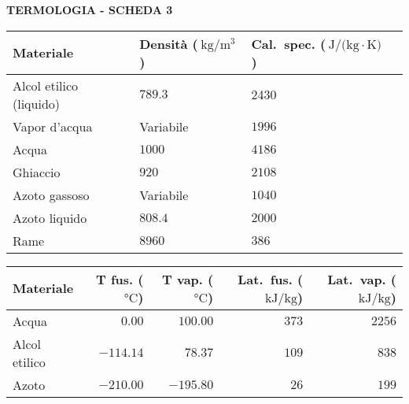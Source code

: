 

\begin{center}
    \textbf{\Large \sffamily TERMOLOGIA - SCHEDA 3}
\end{center}\vspace{\baselineskip}

\noindent
\centering\begin{tabular}{llll}
    \textbf{Materiale}  & \textbf{Densità}  ($\SI{}{\kilogram/\meter^3}$)  & \textbf{Cal.\ spec.} ($\SI{}{\joule/(\kilogram\cdot\kelvin})$) \\ \hline
    Alcol etilico (liquido) & $\num{789.3}$ & \num{2430}\\ \hline
    Vapor d'acqua & Variabile & $\num{1996}$\\ \hline
    Acqua & $\num{1000}$ & $\num{4186}$\\ \hline
    Ghiaccio & $\num{920}$ & $\num{2108}$\\ \hline
    Azoto gassoso & Variabile & $\num{1040}$\\ \hline
    Azoto liquido & $\num{808.4}$ & $\num{2000}$ \\ \hline
    Rame & $\num{8960}$ & $\num{386}$\\ \hline
\end{tabular}\vspace{\baselineskip}

\centering\begin{tabular}{lrrrr}
    \textbf{Materiale}  & \textbf{T fus.} ($\SI{}{\celsius}$)  
    & \textbf{T vap.} ($\SI{}{\celsius}$) 
    &  \textbf{Lat.\ fus.}  ($\SI{}{\kilo\joule/\kilogram}$)
    &  \textbf{Lat.\ vap.} ($\SI{}{\kilo\joule/\kilogram}$)
    \\ \hline
    Acqua & $\num{0,00}$ &  $\num{100,00}$
    & $\num{373}$ & $\num{2256}$\\ \hline
    Alcol etilico & $\num{-114.14}$ & $\num{78.37}$ 
    & $\num{109}$ & $\num{838}$\\ \hline
    Azoto & $\num{-210.00}$ &  $\num{-195.80}$ 
    & $\num{26}$ & $\num{199}$\\ \hline
\end{tabular}

